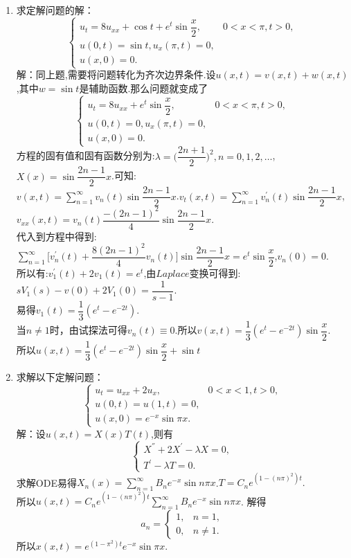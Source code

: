 \documentclass[11pt]{article}
\begin{document}
\begin{enumerate}
        \item 求定解问题的解：
           \[
        \left\{
         \begin{array}{lr}
         u_{t}=8u_{xx}+\cos t +e^{t}\sin\dfrac{x}{2},&0<x<\pi,t>0, \\
         u(0,t)=\sin t, u_x(\pi,t)=0, \\
         u(x,0)=0.
         \end{array}
        \right. \]
            解：同上题,需要将问题转化为齐次边界条件.设$u(x,t)=v(x,t)+w(x,t)$,其中$w=\sin t$是辅助函数.那么问题就变成了\[
        \left\{
         \begin{array}{lr}
         u_{t}=8u_{xx}+e^{t}\sin\dfrac{x}{2},&0<x<\pi,t>0, \\
         u(0,t)=0, u_x(\pi,t)=0, \\
         u(x,0)=0.
         \end{array}
        \right. \]
        方程的固有值和固有函数分别为:$\lambda=\big(\dfrac{2n+1}{2}\big)^2,n=0,1,2,\dots$,$X(x)=\sin\dfrac{2n-1}{2}x$.可知:
        \\ $v(x,t)=\sum\limits_{n=1}^{\infty}v_n(t)\sin\dfrac{2n-1}{2}x$.$v_t(x,t)=\sum\limits_{n=1}^{\infty}v_n^{'}(t)\sin\dfrac{2n-1}{2}x$,$v_{xx}(x,t)=v_n(t)\dfrac{-(2n-1)^2}{4}\sin\dfrac{2n-1}{2}x$.\\
        代入到方程中得到:$\sum\limits_{n=1}^{\infty}\big[v_n^{'}(t)+\dfrac{8(2n-1)^2}{4}v_n(t)\big]\sin\dfrac{2n-1}{2}x=e^t\sin\dfrac{x}{2}$,$v_n(0)=0$.\\所以有:$v_1^{'}(t)+2v_1(t)=e^t$,由$Laplace$变换可得到:$sV_1(s)-v(0)+2V_1(0)=\dfrac{1}{s-1}$.\\易得$v_1(t)=\dfrac{1}{3}(e^t-e^{-2t})$.\\当$n\neq 1$时，由试探法可得$v_n(t)\equiv 0$.所以$v(x,t)=\dfrac{1}{3}(e^t-e^{-2t})\sin\dfrac{x}{2}$.\\所以$u(x,t)=\dfrac{1}{3}(e^t-e^{-2t})\sin\dfrac{x}{2}+\sin t$
        \item 求解以下定解问题：
           \[
        \left\{
         \begin{array}{lr}
         u_{t}=u_{xx}+2u_x,&0<x<1,t>0, \\
         u(0,t)=u(1,t)=0, \\
         u(x,0)=e^{-x}\sin\pi x.
         \end{array}
        \right. \]
            解：设$u(x,t)=X(x)T(t)$,则有
        \[ \begin{cases}
         X^{''}+2X^{'}-\lambda X=0,\\
         T^{'}-\lambda T = 0.
        \end{cases} \]
        求解ODE易得$X_n(x)=\sum\limits_{n=1}^{\infty}B_{n}e^{-x}\sin n\pi x$.\quad $T=C_{n}e^{(1-(n\pi)^2)t}.$\\所以$u(x,t)=C_{n}e^{(1-(n\pi)^2)t}\sum\limits_{n=1}^{\infty}B_{n}e^{-x}\sin n\pi x$.
        解得\[
                a_n=\begin{cases}
                        1, & n=1, \\
                        0, & n\neq 1.
                \end{cases}
        \]
        所以$x(x,t)=e^{(1-\pi^2)t}e^{-x}\sin\pi x$.
    \end{enumerate}
\end{document}
